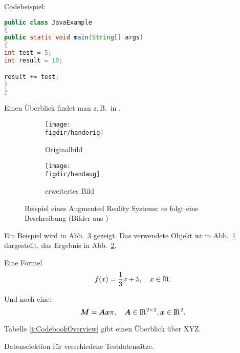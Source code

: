 Codebeispiel:
\begin{lstlisting}[language=java,firstnumber=1,caption=Java Beispiel,label=lst:example]
public class JavaExample 
{
public static void main(String[] args) 
{
int test = 5;
int result = 10;

result += test;
}
}
\end{lstlisting}

Einen Überblick findet man z.\,B.\ in \cite{Auer00:HTF}.

\begin{figure}[t]
	\centering
	
	\begin{subfigure}{0.45\linewidth}
		\centering
		\texttt{[image: \\figdir/handorig]}
		\caption{Originalbild}
		\label{FIG:arexorig}
	\end{subfigure}
	\begin{subfigure}{0.45\linewidth}
		\centering
		\texttt{[image: \\figdir/handaug]}
		\caption{erweitertes Bild}
		\label{FIG:arexaugm}
	\end{subfigure}
	\caption[AR Beispiel]
	{Beispiel eines Augmented Reality Systems: es folgt eine Beschreibung (Bilder aus \cite{Schmidt01:PAO})}
	\label{FIG:arex}
\end{figure}

Ein Beispiel wird in Abb.\ \ref{FIG:arex} gezeigt.
Das verwendete Objekt ist in Abb.\ \ref{FIG:arexorig} dargestellt, das Ergebnis in Abb.\ \ref{FIG:arexaugm}.

Eine Formel
\begin{equation}
\label{eq:cvp:test}
f(x) = \frac{1}{3} x + 5, \quad x \in \mathord{\mathrm{I\!R}}.
\end{equation}

Und noch eine:
\begin{equation}
\label{eq:cvp:matvec}
\bm{M}  = \bm{Ax} \pi, \quad \bm{A} \in \mathord{\mathrm{I\!R}}^{2 \times 2}, \bm{x} \in \mathord{\mathrm{I\!R}}^2.
\end{equation}

Tabelle \ref{t:CodebookOverview} gibt einen Überblick über XYZ.

\begin{table}[t]
	\centering\small
	
	\caption[Testtabelle]{Datenselektion für verschiedene Testdatensätze.}
	\label{t:CodebookOverview}
\end{table}


